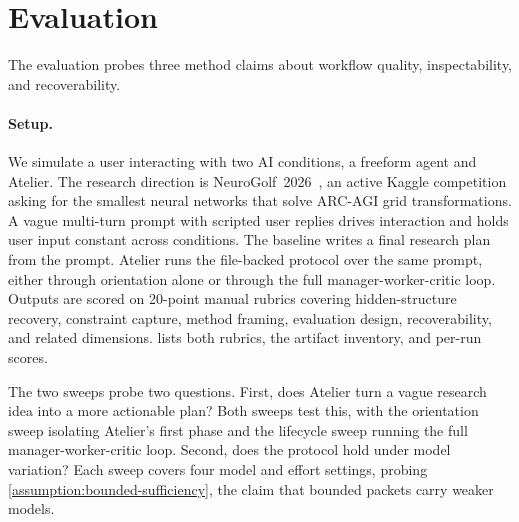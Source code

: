\section{Evaluation}
\label{sec:evaluation}

The evaluation probes three method claims about workflow quality, inspectability, and recoverability.

\paragraph{Setup.}
We simulate a user interacting with two AI conditions, a freeform agent and Atelier. The research direction is NeuroGolf~2026~\citep{neurogolf2026}, an active Kaggle competition asking for the smallest neural networks that solve ARC-AGI grid transformations. A vague multi-turn prompt with scripted user replies drives interaction and holds user input constant across conditions. The baseline writes a final research plan from the prompt. Atelier runs the file-backed protocol over the same prompt, either through orientation alone or through the full manager-worker-critic loop. Outputs are scored on 20-point manual rubrics covering hidden-structure recovery, constraint capture, method framing, evaluation design, recoverability, and related dimensions.  lists both rubrics, the artifact inventory, and per-run scores.

The two sweeps probe two questions. First, does Atelier turn a vague research idea into a more actionable plan? Both sweeps test this, with the orientation sweep isolating Atelier's first phase and the lifecycle sweep running the full manager-worker-critic loop. Second, does the protocol hold under model variation? Each sweep covers four model and effort settings, probing \cref{assumption:bounded-sufficiency}, the claim that bounded packets carry weaker models.

